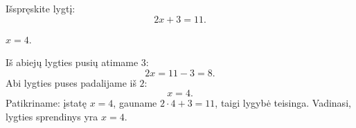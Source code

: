 \begin{salyga}
Išspręskite lygtį:
\[
  2x+3=11.
\]
\end{salyga}

\begin{atsakymas}
$x=4$.
\end{atsakymas}

\begin{sprendimas}
Iš abiejų lygties pusių atimame $3$:
\[
  2x=11-3=8.
\]
Abi lygties puses padalijame iš $2$:
\[
  x=4.
\]
Patikriname: įstatę $x=4$, gauname $2\cdot4+3=11$, taigi lygybė teisinga.
Vadinasi, lygties sprendinys yra $x=4$.
\end{sprendimas}
